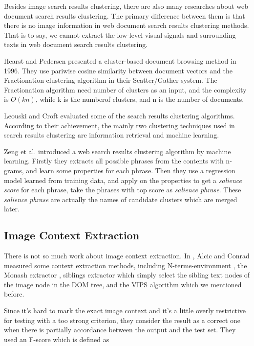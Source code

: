 Besides image search results clustering, there are also many researches about
web document search results clustering. The primary difference between them is
that there is no image information in web document search results clustering
methods. That is to say, we cannot extract the low-level visual signals and
surrounding texts in web document search results clustering.

Hearst and Pedersen \cite{Hearst1996} presented a cluster-based document
browsing method in 1996. They use pariwise cosine similarity between document
vectors and the Fractionation clustering algorithm in their Scatter/Gather
system. The Fractionation algorithm need number of clusters as an input, and the
complexity is $O(kn)$, while k is the numberof clusters, and n is the number of
documents.

Leouski and Croft \cite{Leouski1996} evaluated some of the search results clustering
algorithms. According to their achievement, the mainly two clustering techniques
used in search results clustering are information retrieval and machine
learning.

Zeng et al. \cite{Zeng2004} introduced a web search results clustering algorithm
by machine learning. Firstly they extracts all possible phrases from the
contents with n-grams, and learn some properties for each phrase. Then they use
a regression model learned from training data, and apply on the properties to
get a \textit{salience score} for each phrase, take the phrases with top score
as \textit{salience phrase}. These \textit{salience phrase} are actually the
names of candidate clusters which are merged later.


\subsection{Image Context Extraction}

There is not so much work about image context extraction. In \cite{Alcic2010},
Alcic and Conrad measured some context extraction methods, including
N-terms-environment \cite{Coelho2004}, the Monash extractor \cite{Fauzi2009},
siblings extractor which simply select the sibling text nodes of the image node
in the DOM tree, and the VIPS \cite{VIPS} algorithm which we mentioned before.

Since it's hard to mark the exact image context and it's a little overly
restrictive for testing with a too strong criterion, they consider the result
as a correct one when there is partially accordance between the output and the
test set. They used an F-score which is defined as

